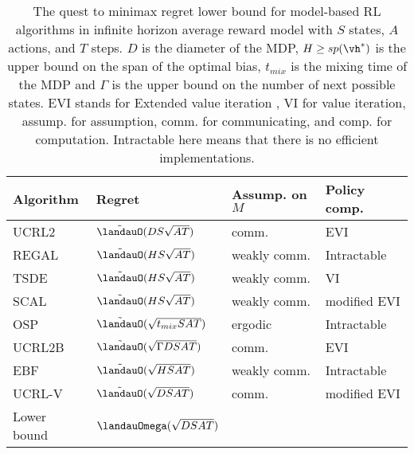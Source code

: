 \begin{table}[ht]
\begin{tabular}{|l|l|l|l|}
\hline
Algorithm & Regret & Assump. on $M$ & Policy comp.            \\ \hline
UCRL2 \cite{jaksch2010near}       & $\tilde{\landauO}(DS\sqrt{AT})$ & comm.         & EVI \\ 
REGAL \cite{bartlett2012regal}      & $\tilde{\landauO}(HS\sqrt{AT})$  & weakly comm. & Intractable   \\ 
TSDE \cite{ouyang2017learning}        & $\tilde{\landauO}(HS\sqrt{AT})$ & weakly comm. & VI       \\ 
SCAL \cite{fruit2018efficient}        & $\tilde{\landauO}(HS\sqrt{AT})$ & weakly comm. & modified EVI           \\
OSP \cite{ortner2020regret}         & $\tilde{\landauO}(\sqrt{t_{mix}SAT})$ & ergodic           & Intractable   \\ 
UCRL2B \cite{fruit2020improved}      & $\tilde{\landauO}(\sqrt{\Gamma DSAT})$ & comm.      & EVI                           \\
EBF \cite{zhang2019regret}         & $\tilde{\landauO}(\sqrt{HSAT})$ & weakly comm.     & Intractable   \\
UCRL-V \cite{tossou2019near}         & $\tilde{\landauO}(\sqrt{DSAT})$ & comm.     & modified EVI   \\ \hline
Lower bound & $\landauOmega(\sqrt{DSAT})$ \cite{jaksch2010near} &                              &                               \\ \hline
\end{tabular}
\caption{The quest to minimax regret lower bound for model-based RL algorithms in infinite horizon average reward model with $S$ states, $A$ actions, and $T$ steps.
$D$ is the diameter of the MDP, $H\ge sp(\vh^*)$ is the upper bound on the span of the optimal bias, $t_{mix}$ is the mixing time of the MDP and $\Gamma$ is the upper bound on the number of next possible states.
EVI stands for Extended value iteration \cite{jaksch2010near}, VI for value iteration, assump. for assumption, comm. for communicating, and comp. for computation.
Intractable here means that there is no efficient implementations.
}
\label{ch:restless:tab:infinite}
\end{table}


